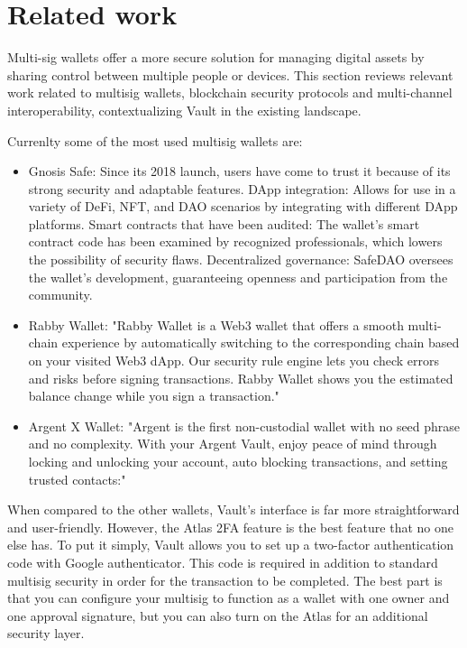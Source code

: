 \section{Related work}
\label{sec:ch1sec3}

\par Multi-sig wallets offer a more secure solution for managing digital assets by sharing control between multiple people or devices. This section reviews relevant work related to multisig wallets, blockchain security protocols and multi-channel interoperability, contextualizing Vault in the existing landscape.
\par Currenlty some of the most used multisig wallets are:
\begin{itemize}
	\item Gnosis Safe: Since its 2018 launch, users have come to trust it because of its strong security and adaptable features. DApp integration: Allows for use in a variety of DeFi, NFT, and DAO scenarios by integrating with different DApp platforms. Smart contracts that have been audited: The wallet's smart contract code has been examined by recognized professionals, which lowers the possibility of security flaws. Decentralized governance: SafeDAO oversees the wallet's development, guaranteeing openness and participation from the community.
	\item Rabby Wallet: "Rabby Wallet is a Web3 wallet that offers a smooth multi-chain experience by automatically switching to the corresponding chain based on your visited Web3 dApp. Our security rule engine lets you check errors and risks before signing transactions. Rabby Wallet shows you the estimated balance change while you sign a transaction."\cite{rabbywallet}
	\item Argent X Wallet: "Argent is the first non-custodial wallet with no seed phrase and no complexity. With your Argent Vault, enjoy peace of mind through locking and unlocking your account, auto blocking transactions, and setting trusted contacts:"\cite{argent}
\end{itemize}

\par When compared to the other wallets, Vault's interface is far more straightforward and user-friendly. However, the Atlas 2FA feature is the best feature that no one else has. To put it simply, Vault allows you to set up a two-factor authentication code with Google authenticator. This code is required in addition to standard multisig security in order for the transaction to be completed. The best part is that you can configure your multisig to function as a wallet with one owner and one approval signature, but you can also turn on the Atlas for an additional security layer.